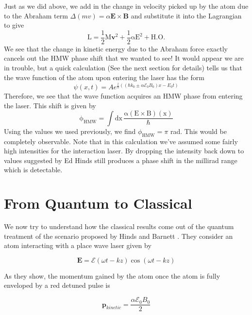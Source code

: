 \documentclass[twocolumn,english,pra,aps,superscriptaddress,floatfix]{revtex4-1}
\begin{document}
Just as we did above, we add in the change in velocity picked up by the atom due to the Abraham term $\Delta(mv)=\alpha\mathbf{E}\times\mathbf{B}$ and substitute it into the Lagrangian to give
\begin{equation}
\mathrm{L}=\frac{1}{2}\mathrm{M\mathbf{v}^2 +\frac{1}{2}\alpha E^2 +H.O.}
\label{lagrangian4}
\end{equation}
We see that the change in kinetic energy due to the Abraham force exactly cancels out the HMW phase shift that we wanted to see!  It would appear we are in trouble, but a quick calculation (See the next section for details) tells us that the wave function of the atom upon entering the laser has the form
\begin{equation}
\psi(x,t)=Ae^{\frac{i}{\hbar}((\hbar k_0 \pm\alpha\mathcal{E}_0B_0)x-E_0 t)}
\end{equation}
Therefore, we see that the wave function acquires an HMW phase from entering the laser.  This shift is given by
\begin{equation}
\mathrm{\phi_{HMW}=\int dx\,\frac{\alpha (E\times B)(x)}{\hbar}}
\end{equation}
Using the values we used previously, we find $\phi_{\mathrm{HMW}}=\pi$ rad.  This would be completely observable.  Note that in this calculation we've assumed some fairly high intensities for the interaction laser.  By dropping the intensity back down to values suggested by Ed Hinds still produces a phase shift in the millirad range which is detectable.    

\section{From Quantum to Classical}
\label{sec:classical}
We now try to understand how the classical results come out of the quantum treatment of the scenario proposed by Hinds and Barnett \cite{hinds}.  They consider an atom interacting with a place wave laser given by

\begin{equation}
\mathbf{E}=\mathcal{E}(\omega t - kz)\cos{\left(\omega t - kz\right)}
\end{equation}

As they show, the momentum gained by the atom once the atom is fully enveloped by a red detuned pulse is

\begin{equation}
\mathbf{p}_{kinetic}=\frac{\alpha\mathcal{E}_0B_0}{2}
\end{equation}
\end{document}
